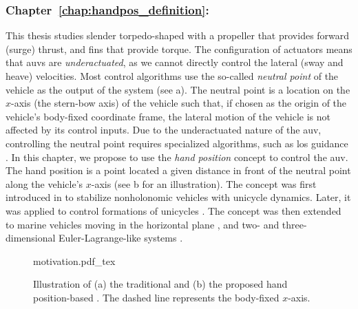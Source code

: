 

\subsubsection{Chapter~\ref{chap:handpos_definition}: }

This thesis studies slender torpedo-shaped  with a propeller that provides forward (surge) thrust, and fins that provide torque.
The configuration of actuators means that \glspl{auv} are \emph{underactuated}, as we cannot directly control the lateral (sway and heave) velocities.
Most control algorithms use the so-called \emph{neutral point} of the vehicle as the output of the system (see a).
The neutral point is a location on the $x$-axis (the stern-bow axis) of the vehicle such that, if chosen as the origin of the vehicle's body-fixed coordinate frame, the lateral motion of the vehicle is not affected by its control inputs.
Due to the underactuated nature of the \gls{auv}, controlling the neutral point requires specialized algorithms, such as \acrlong{los} guidance \cite{caharija_path-following-ILOS_2016,xiang_path-following-robust_2017,miao_path-following-curvilinear_2017,borhaug_straight_2007}.
In this chapter, we propose to use the \emph{hand position} concept to control the \gls{auv}.
The hand position is a point located a given distance in front of the neutral point along the vehicle's $x$-axis (see b for an illustration).
The concept was first introduced in \cite{pomet_hand-position_1992} to stabilize nonholonomic vehicles with unicycle dynamics.
Later, it was applied to control formations of unicycles \cite{lawton_hand-position-formation_2003}.
The concept was then extended to marine vehicles moving in the horizontal plane \cite{paliotta_trajectory_2019}, and two- and three-dimensional Euler-Lagrange-like systems \cite{cai_hand-position-rigidity-planar_2015,li_hand-position-rigidity-3d_2021}.

\begin{figure}[b]
    \centering
    \def\svgwidth{0.65\textwidth}
    {motivation.pdf_tex}
    \caption{Illustration of (a) the traditional  and (b) the proposed hand position-based . The dashed line represents the body-fixed $x$-axis.}
    \label{fig:handpos_def_motivation}
\end{figure}

